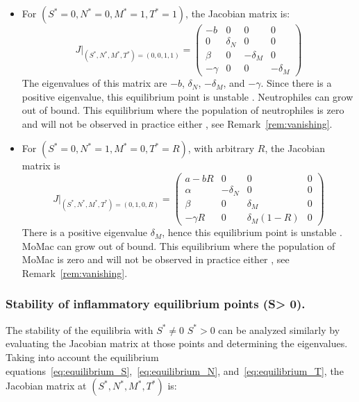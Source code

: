 \documentclass[a4paper, 12pt]{article}
\providecommand{\DIFaddtex}[1]{{\protect\color{blue} \sf #1}} %
\providecommand{\DIFdeltex}[1]{{\protect\color{red} \scriptsize #1}} %
\providecommand{\DIFaddbegin}{} %
\providecommand{\DIFaddend}{} %
\providecommand{\DIFdelbegin}{} %
\providecommand{\DIFdelend}{} %
\providecommand{\DIFadd}[1]{\texorpdfstring{\DIFaddtex{#1}}{#1}} %
\providecommand{\DIFdel}[1]{\texorpdfstring{\DIFdeltex{#1}}{}} %
\begin{document}
\begin{itemize}
\DIFaddend \item For $(S^* = 0, N^* = 0, M^* = 1, T^* = 1)$, the Jacobian matrix is:
\[
J|_{(S^*, N^*, M^*, T^*) = (0, 0, 1, 1)} =
\begin{pmatrix}
-b & 0 & 0 & 0 \\
0 & \delta_N & 0 & 0 \\
\beta & 0 & -\delta_M & 0 \\
-\gamma & 0 & 0 & -\delta_M
\end{pmatrix}
\]
The eigenvalues of this matrix are $-b$, $\delta_N$, $-\delta_M$, and $-\gamma$. Since there is a positive eigenvalue, this equilibrium point is unstable \DIFdelbegin \DIFdel{. Neutrophiles can grow out of bound. This equilibrium where the population of neutrophiles is zero }\DIFdelend \DIFaddbegin \DIFadd{and }\DIFaddend will not be observed in practice either\DIFdelbegin \DIFdel{, see Remark~\ref{rem:vanishing}}\DIFdelend .
\item For $(S^* = 0, N^* = 1, M^* = 0, T^* = R)$, with arbitrary $R$, the Jacobian matrix is
\[
J|_{(S^*, N^*, M^*, T^*) = (0, 1, 0, R)} =
\begin{pmatrix}
a - b R & 0 & 0 & 0 \\
\alpha & -\delta_N & 0 & 0 \\
\beta & 0 & \delta_M & 0 \\
-\gamma R & 0 & \delta_M (1 - R) & 0
\end{pmatrix}
\]
There is a positive eigenvalue $\delta_M$, hence this equilibrium point is unstable \DIFdelbegin \DIFdel{. MoMac can grow out of bound. This equilibrium  where the population of MoMac is zero }\DIFdelend \DIFaddbegin \DIFadd{and }\DIFaddend will not be observed in practice either\DIFdelbegin \DIFdel{, see Remark~\ref{rem:vanishing}}\DIFdelend .
\end{itemize}
\subsubsection{Stability of inflammatory equilibrium points (S> 0).}
The stability of the equilibria with \DIFdelbegin \DIFdel{$S^* \neq 0$ }\DIFdelend \DIFaddbegin \DIFadd{$S^* > 0$ }\DIFaddend can be analyzed similarly by evaluating the Jacobian matrix at those points and determining the eigenvalues.
Taking into account the equilibrium equations~\eqref{eq:equilibrium_S},~\eqref{eq:equilibrium_N}, and~\eqref{eq:equilibrium_T}, the Jacobian matrix at $(S^*, N^*, M^*, T^*)$ is:
\end{document}

